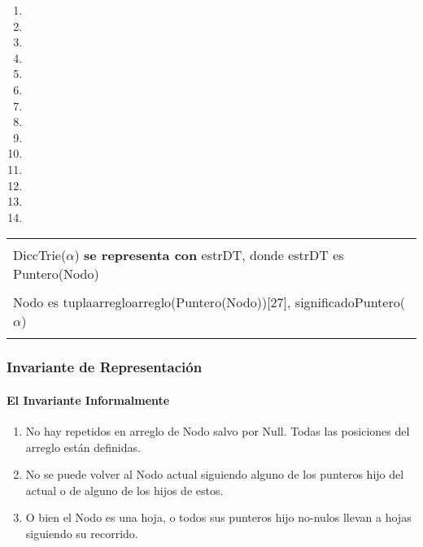 \documentclass[10pt, a4paper]{article}
\begin{document}
    \begin{enumerate}
     \item 
      
     \item 

     \item 

      \item 
      
     \item 

     \item 

      \item 
      
     \item 

     \item 

\item 
      
     \item 

     \item 

\item 
      
     \item       

    \end{enumerate}
		
\begin{center}
\begin{tabular}{|l|} 
\hline
\\
DiccTrie($\alpha$) \textbf{se representa con} estrDT, donde estrDT es Puntero(Nodo)\\
\\
\hspace*{6em}Nodo es tupla{{arreglo}{arreglo(Puntero(Nodo))[27]}, {significado}{Puntero($\alpha$)}}\\
\\
\hline
\end{tabular}
\end{center}


\subsubsection{Invariante de Representaci\'on}
\paragraph{El Invariante Informalmente}
\begin{enumerate}
\item No hay repetidos en arreglo de Nodo salvo por Null. Todas las posiciones del arreglo están definidas.
\item No se puede volver al Nodo actual siguiendo alguno de los punteros hijo del actual o de alguno de los hijos de estos.
\item O bien el Nodo es una hoja, o todos sus punteros hijo no-nulos llevan a hojas siguiendo su recorrido.
\end{enumerate}
\end{document}
